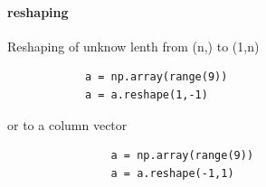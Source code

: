 \paragraph{reshaping}
    Reshaping of unknow lenth from (n,) to (1,n)
    \begin{verbatim}
            a = np.array(range(9))
            a = a.reshape(1,-1)
    \end{verbatim}
    or to a column vector
    \begin{verbatim}
                a = np.array(range(9))
                a = a.reshape(-1,1)
    \end{verbatim}